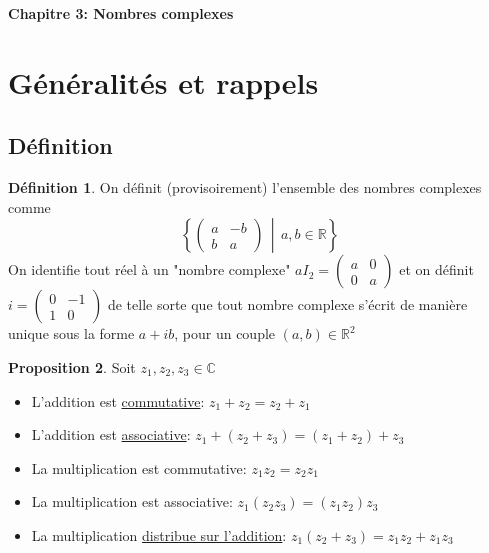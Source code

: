 \documentclass[10pt,a4paper]{article}
\theoremstyle{definition}
\newtheorem{proposition}{Proposition}[section]
\newtheorem{definition}[proposition]{Définition}
\begin{document}
\renewcommand{\labelitemi}{$*$}
\renewcommand{\labelenumi}{(\roman{enumi})}
\begin{center}
{\Large \textbf{Chapitre 3: Nombres complexes}}
\end{center}

\section{Généralités et rappels}
\subsection{Définition}
\begin{definition}
On définit (provisoirement) l'ensemble des nombres complexes comme
\[ \left\{ \begin{pmatrix}
a & -b \\
b & a
\end{pmatrix} \,\middle|\, a, b \in \mathbb{R} \right\}\]
On identifie tout réel à un "nombre complexe" $aI_2 = \begin{pmatrix}
a & 0 \\
0 & a
\end{pmatrix}$ et on définit $i = \begin{pmatrix}
0 & -1 \\
1 & 0
\end{pmatrix}$ de telle sorte que tout nombre complexe s'écrit de manière unique sous la forme $a + ib$, pour un couple $(a, b) \in \mathbb{R}^2$
\end{definition}
\begin{proposition}
Soit $z_1, z_2, z_3 \in \mathbb{C}$
\begin{itemize}
\item L'addition est \uline{commutative}: $z_1 + z_2 = z_2 + z_1$
\item L'addition est \uline{associative}: $z_1 + (z_2 + z_3) = (z_1 + z_2) + z_3$
\item La multiplication est commutative: $z_1 z_2 = z_2 z_1$
\item La multiplication est associative: $z_1 (z_2 z_3) = (z_1 z_2) z_3$
\item La multiplication \uline{distribue sur l'addition}: $z_1 (z_2 + z_3) = z_1 z_2 + z_1 z_3$
\end{itemize}
\end{proposition}
\end{document}
